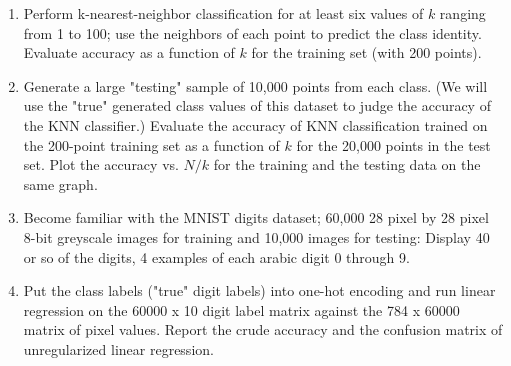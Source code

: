 \documentclass[12pt]{book}
\theoremstyle{definition}
\begin{document}
\begin{enumerate}
\item
Perform k-nearest-neighbor classification for at least six values of $k$ ranging from 1 to 100; use the neighbors of each point to predict the class identity.  Evaluate accuracy as a function of $k$ for the training set (with 200 points).

\item
Generate a large "testing" sample of 10,000 points from each class.  (We will use the "true" generated class values of this dataset to judge the accuracy of the KNN classifier.)
Evaluate the accuracy of KNN classification trained on the 200-point training set as a function of $k$ for the 20,000 points in the test set.  Plot the accuracy vs. $N/k$ for the training and the testing data on the same graph.   

\item
Become familiar with the MNIST digits dataset; 60,000 28 pixel by 28 pixel 8-bit greyscale images for training and 10,000 images for testing:  Display 40 or so of the digits, 4 examples of each arabic digit 0 through 9. 

\item 
Put the class labels ("true" digit labels) into one-hot encoding and run linear regression on the 60000 x 10 digit label matrix against the 784 x 60000 matrix of pixel values.
Report the crude accuracy and the confusion matrix of unregularized linear regression.






\end{enumerate}
\end{document}
